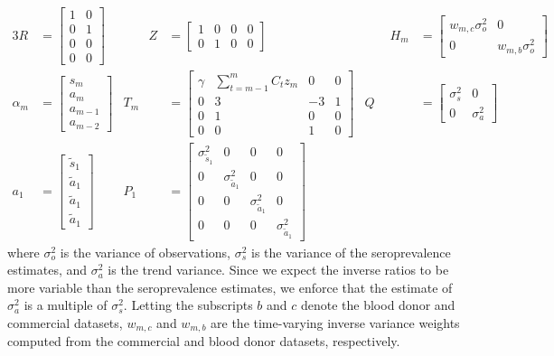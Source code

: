 \documentclass{article}
\begin{document}
\begin{alignat*}{3}
R &= \begin{bmatrix}
1 & 0  \\ 
0 & 1 \\ 
0 & 0 \\ 
0 & 0 
\end{bmatrix} &\qquad 
Z &= \begin{bmatrix}
1 & 0 & 0 & 0 \\ 
0 & 1 & 0 & 0 
\end{bmatrix} &\qquad 
H_m &= \begin{bmatrix} %
w_{m,c}\sigma^2_o & 0 \\ 
0 & w_{m,b}\sigma^2_o
\end{bmatrix} \\
\alpha_m &= \begin{bmatrix}
s_{m}\\
a_m\\ 
a_{m-1}\\ 
a_{m-2}
\end{bmatrix} & 
T_m &= \begin{bmatrix}
 \gamma & \sum_{t = m-1}^{m} C_t z_m & 0 & 0\\ 
 0 & 3 & -3 & 1 \\ 
 0 & 1 & 0 & 0\\ 
 0 & 0 & 1 & 0
\end{bmatrix}  & 
Q &= \begin{bmatrix} 
\sigma^2_s & 0  \\ 
0 & \sigma^2_a
\end{bmatrix} \\
a_1 &= \begin{bmatrix}
\tilde{s}_{1}\\ 
\tilde{a}_1\\ 
\tilde{a}_1 \\
\tilde{a}_1
\end{bmatrix} & 
P_{1} &= \begin{bmatrix}
\sigma^2_{\tilde{s}_{1}} & 0 & 0 & 0 \\ 
0 & \sigma^2_{\tilde{a}_1} & 0 & 0\\ 
0 & 0 & \sigma^2_{\tilde{a}_1} & 0 \\ 
0 & 0 & 0 & \sigma^2_{\tilde{a}_1}
\end{bmatrix} 
\end{alignat*}
where $\sigma^2_o$ is the variance of observations,
$\sigma^2_s$ is the variance of the seroprevalence estimates, 
and $\sigma^2_a$ is the trend variance. Since we expect the 
inverse ratios to be more variable than the seroprevalence estimates, 
we enforce that the estimate of $\sigma^2_a$ is a multiple of 
$\sigma^2_s$. Letting the subscripts $b$ and $c$ denote
the blood donor and commercial datasets, $w_{m,c}$ and $w_{m,b}$ are the
time-varying inverse variance weights computed from the commercial and blood
donor datasets, respectively. 
\end{document}
